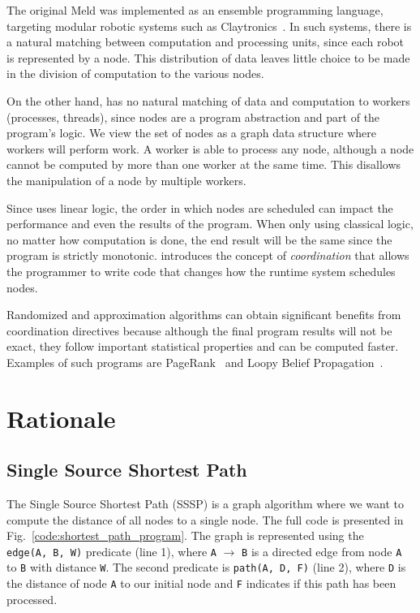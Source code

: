The original Meld was
implemented as an ensemble programming language, targeting modular robotic systems such as
Claytronics~\cite{ashley-rollman-derosa-iros07wksp}. In such systems, there is a natural matching
between computation and processing units, since each robot is represented by a node. This distribution
of data leaves little choice to be made in the division of computation to the various nodes.

On the other hand, \lang has no natural matching of data and computation to workers (processes, threads),
since nodes are a program abstraction and part of the program's logic.
We view the set of nodes as a graph data structure where workers will perform work.
A worker is able to process any node, although a node cannot be computed by more than one worker
at the same time. This disallows the manipulation of a node by multiple workers.

Since \lang uses linear logic, the order in which nodes are scheduled can impact the
performance and even the results of the program. When only using
classical logic, no matter how computation is done, the end result will be the same since the program
is strictly monotonic.
\lang introduces the concept of \emph{coordination} that allows the programmer
to write code that changes how the runtime system schedules nodes.

Randomized and approximation
algorithms can obtain significant benefits from coordination directives because although the final
program results will not be exact, they follow important statistical properties and can be computed faster.
Examples of such programs are PageRank~\cite{Lubachevsky:1986:CAA:4904.4801} and
Loopy Belief Propagation~\cite{Gonzalez+al:aistats09paraml}.

\section{Rationale}

\subsection{Single Source Shortest Path}

The Single Source Shortest Path (SSSP) is a graph algorithm where we want to compute the
distance of all nodes to a single node. The full code is presented in Fig.~\ref{code:shortest_path_program}.
The graph is represented using the \texttt{edge(A,~B,~W)} predicate (line 1), where
\texttt{A} $\rightarrow$ \texttt{B} is a directed edge from node \texttt{A} to \texttt{B}
with distance \texttt{W}. The second predicate is \texttt{path(A,~D,~F)} (line 2), where
\texttt{D} is the distance of node \texttt{A} to our initial node and \texttt{F}
indicates if this path has been processed.

